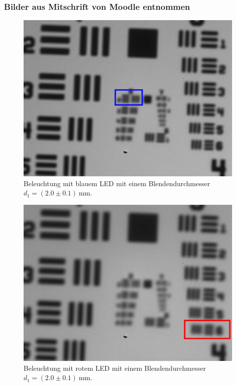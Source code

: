 \documentclass{article}
\begin{document}
\newpage




\subsubsection{Bilder aus Mitschrift von Moodle entnommen}


\begin{minipage}[t]{.45\textwidth}
\begin{figure}[H]
\includegraphics[scale=0.5]{jw/B_B2_mark.jpg}
\caption{Beleuchtung mit blauem LED mit einem Blendendurchmesser $d_1=(2.0\pm0.1)~$mm.}
\label{fig:bbild_2_blau_jw}
\end{figure}
\end{minipage}
\hfill
\noindent
\begin{minipage}[t]{.45\textwidth}
\begin{figure}[H]
\includegraphics[scale=0.5]{jw/R_B2_mark.jpg}
\caption{Beleuchtung mit rotem LED mit einem Blendendurchmesser $d_1=(2.0\pm0.1)~$mm.}
\label{fig:bbild_2_rot_jw}
\end{figure}
\end{minipage}
\end{document}
